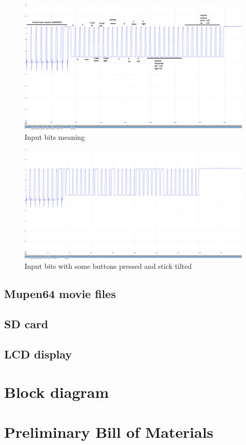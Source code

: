 \documentclass[a4paper,oneside,12pt]{article}
\begin{document}
\begin{figure}
  \includegraphics[width=\textwidth]{input_legend.png}
  \caption{Input bits meaning}
  \label{input_legend}
\end{figure}

\begin{figure}
  \includegraphics[width=\textwidth]{some_input.png}
  \caption{Input bits with some buttons pressed and stick tilted}
  \label{some_input}
\end{figure}

\subsection{Mupen64 movie files}

\subsection{SD card}

\subsection{LCD display}

\section{Block diagram}

\section{Preliminary Bill of Materials}
\end{document}
